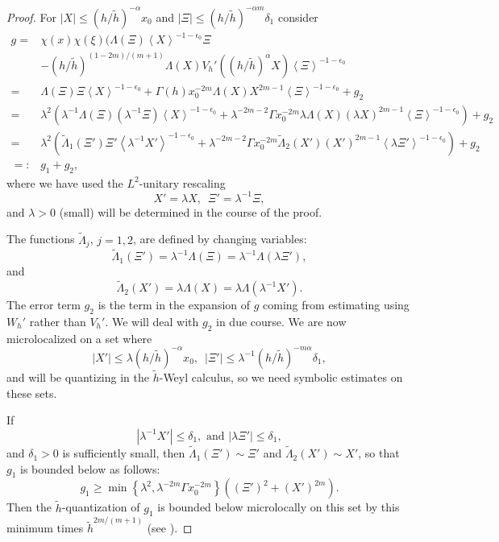 \documentclass[twoside, final]{amsart}
\theoremstyle{definition}
\numberwithin{equation}{section}
\begin{document}
\begin{proof}
 For $|X| {\leqslant} (h/{\tilde{h}})^{-\alpha} x_0$ and $|
\Xi | {\leqslant} (h / {\tilde{h}} )^{-\alpha m} \delta_1$ consider 
\begin{align*}
g = & \chi(x)\chi(\xi)\big(
\Lambda(\Xi)
{{\left\langle{{X}}\right\rangle}}^{-1-{{\epsilon}}_0}\Xi \\
& - (h/{\tilde{h}})^{(1-2m)/(m+1)} \Lambda(X) V_h'( (h/{\tilde{h}})^\alpha X)
{{\left\langle{{\Xi}}\right\rangle}}^{-1-{{\epsilon}}_0} \\
= & \Lambda(\Xi) \Xi {{\left\langle{{X}}\right\rangle}}^{-1-{{\epsilon}}_0} + \Gamma(h) x_0^{-2m} \Lambda(X) X^{2m-1} 
{{\left\langle{{\Xi}}\right\rangle}}^{-1-{{\epsilon}}_0} + g_2 \\
= & \lambda^2 \left( \lambda^{-1}\Lambda ( \Xi ) (\lambda^{-1}\Xi )
  {{\left\langle{{X}}\right\rangle}}^{-1-{{\epsilon}}_0} +  \lambda^{-2m-2}\Gamma x_0^{-2m} \lambda \Lambda (X) ( \lambda X)^{2m-1} {{\left\langle{{\Xi}}\right\rangle}}^{-1-{{\epsilon}}_0} \right)+ g_2 \\
= & \lambda^2 \left( {\widetilde{\Lambda}}_1( \Xi') \Xi' {{\left\langle{{ \lambda^{-1} X'
  }}\right\rangle}}^{-1-{{\epsilon}}_0} + \lambda^{-2m-2}\Gamma x_0^{-2m} {\widetilde{\Lambda}}_2 (X') (X')^{2m-1} {{\left\langle{{ \lambda \Xi'
  }}\right\rangle}}^{-1-{{\epsilon}}_0} \right) + g_2 \\
=: & g_1 + g_2,
\end{align*}
where we have used the $L^2$-unitary rescaling
\[
X' = \lambda X, \,\,\, \Xi' = \lambda^{-1}\Xi,
\]
and $\lambda>0$ (small) will be determined in the course of the proof.

The functions ${\widetilde{\Lambda}}_j$, $j = 1,2$, are defined by changing variables:
\[
{\widetilde{\Lambda}}_1 ( \Xi' ) = \lambda^{-1} \Lambda ( \Xi) = \lambda^{-1}
\Lambda ( \lambda \Xi' ),
\]
and
\[
{\widetilde{\Lambda}}_2( X') = \lambda \Lambda (X) = \lambda \Lambda ( \lambda^{-1}
X' ).
\]
The error term $g_2$ is the term in the expansion of $g$ coming
from estimating using $W_h'$ rather than $V_h'$.  We will deal with $g_2$ in due course.  
We are now microlocalized on a set where
\[
| X' | {\leqslant} \lambda (h/{\tilde{h}})^{-\alpha} x_0, \,\,\, | \Xi' | {\leqslant} \lambda^{-1} (h/{\tilde{h}})^{-m\alpha} \delta_1,
\]
and will be quantizing in the ${\tilde{h}}$-Weyl calculus, so we need symbolic
estimates on these sets.  

If 
\[
| \lambda^{-1} X'| {\leqslant}  \delta_1, \text{ and } | \lambda \Xi' | {\leqslant} \delta_1,
\]
and $\delta_1>0$ is sufficiently small, 
then ${\widetilde{\Lambda}}_1( \Xi') \sim \Xi'$ and ${\widetilde{\Lambda}}_2( X' ) \sim X'$, so
that $g_1$ is bounded below as follows:  
\begin{equation}
\label{E:g1-1}
g_1 {\geqslant} \min \left\{ \lambda^2, \lambda^{-2m} \Gamma x_0^{-2m}
\right\} ( (\Xi')^2 + (X')^{2m} ).
\end{equation}
Then the ${\tilde{h}}$-quantization of $g_1$ is bounded below microlocally on
this set by this minimum times ${\tilde{h}}^{2m/(m+1)}$ (see \cite[Lemma A.2]{ChWu-lsm}).


\end{proof}
\end{document}
